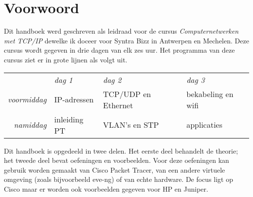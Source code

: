 \section{Voorwoord}

Dit handboek werd geschreven als leidraad voor de cursus \emph{Computernetwerken met TCP/IP} dewelke ik doceer voor Syntra Bizz in Antwerpen en Mechelen.
Deze cursus wordt gegeven in drie dagen van elk zes uur.
Het programma van deze cursus ziet er in grote lijnen als volgt uit.

\begin{center}
   \begin{tabular}{rlll}
                       & \textit{dag 1} & \textit{dag 2}      & \textit{dag 3}     \\[1ex]
   \textit{voormiddag} & IP-adressen    & TCP/UDP en Ethernet & bekabeling en wifi \\
   \textit{namiddag}   & inleiding PT   & VLAN's en STP       & applicaties        \\
   \end{tabular}
\end{center}

Dit handboek is opgedeeld in twee delen.
Het eerste deel behandelt de theorie; het tweede deel bevat oefeningen en voorbeelden.
Voor deze oefeningen kan gebruik worden gemaakt van Cisco Packet Tracer, van een andere virtuele omgeving (zoals bijvoorbeeld eve-ng) of van echte hardware.
De focus ligt op Cisco maar er worden ook voorbeelden gegeven voor HP en Juniper.